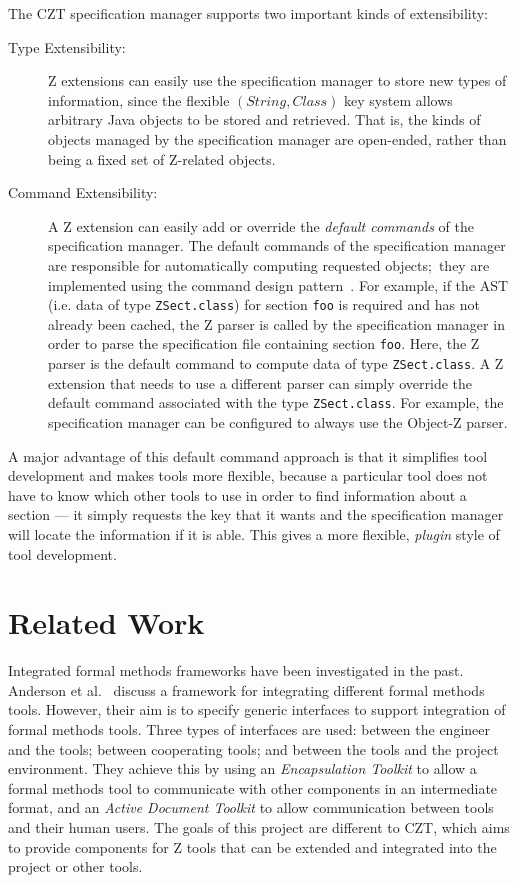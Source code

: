 \documentclass{llncs}
\newcommand{\Interface}[1]{\texttt{#1}}
\begin{document}
  The CZT specification manager supports two important kinds of
  extensibility:
  \begin{description}
  \item[Type Extensibility:] Z extensions can easily use the
    specification manager to store new types of information, since the
    flexible $(String,Class)$ key system allows arbitrary Java objects
    to be stored and retrieved.  That is, the kinds of objects managed
    by the specification manager are open-ended, rather than being a
    fixed set of Z-related objects.
  \item[Command Extensibility:] A Z extension can easily add or
    override the \emph{default commands} of the specification manager.
    The default commands of the specification manager are responsible
    for automatically computing requested objects;~they are
    implemented using the command design pattern~\cite{GamEA:95}. For
    example, if the AST (i.e. data of type \Interface{ZSect.class})
    for section \texttt{foo} is required and has not already been
    cached, the Z parser is called by the specification manager in
    order to parse the specification file containing section
    \texttt{foo}.  Here, the Z parser is the default command to
    compute data of type \Interface{ZSect.class}.  A Z extension that
    needs to use a different parser can simply override the default
    command associated with the type \Interface{ZSect.class}.  For
    example, the specification manager can be configured to always use
    the Object-Z parser.
    \end{description}

  A major advantage of this default command approach is that it
  simplifies tool development and makes tools more flexible, because a
  particular tool does not have to know which other tools to use in
  order to find information about a section --- it simply requests the
  key that it wants and the specification manager will locate the
  information if it is able.  This gives a more flexible,
  \emph{plugin} style of tool development.

\section{Related Work}\label{sec:related-work}

  Integrated formal methods frameworks have been investigated in the
  past. Anderson et al.\ \cite{uitp-anderson} discuss a framework for
  integrating different formal methods tools. However, their aim is to
  specify generic interfaces to support integration of formal methods
  tools. Three types of interfaces are used: between the engineer and
  the tools; between cooperating tools; and between the tools and the
  project environment. They achieve this by using an {\em
  Encapsulation Toolkit} to allow a formal methods tool to communicate
  with other components in an intermediate format, and an {\em Active
  Document Toolkit} to allow communication between tools and their
  human users. The goals of this project are different to CZT, which
  aims to provide components for Z tools that can be extended and
  integrated into the project or other tools.
\end{document}
